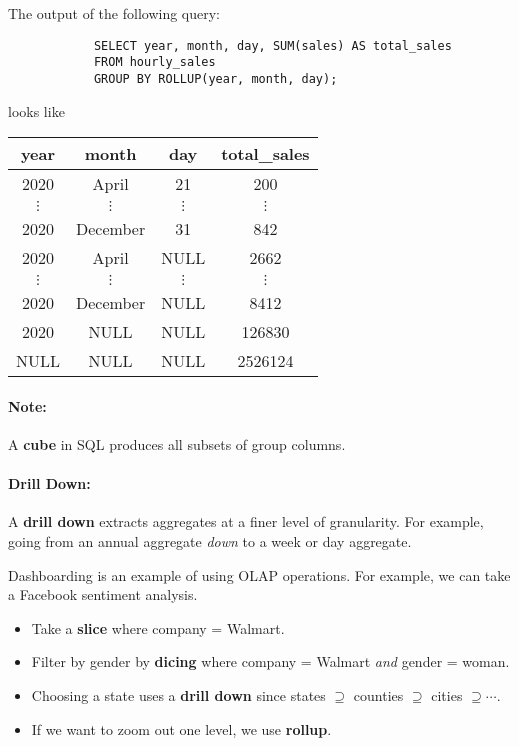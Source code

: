 \documentclass{report}
\newenvironment{example}{\begin{tcolorbox}[title={Example},colback=green!5!white,colframe=black!75!green]}{\end{tcolorbox}}
\renewcommand{\bf}[1]{\textbf{{#1}}}
\renewcommand{\it}[1]{\textit{{#1}}}
\begin{document}
\begin{example}
    The output of the following query:

    {
        \centering
        \begin{BVerbatim}
            SELECT year, month, day, SUM(sales) AS total_sales
            FROM hourly_sales
            GROUP BY ROLLUP(year, month, day);
        \end{BVerbatim}
        \par
    }

    looks like

    \centering
    \begin{tabular}{c|c|c|c}
        year & month & day & total\_sales \\
        \hline
        2020 & April & 21 & 200 \\
        $\vdots$ & $\vdots$ & $\vdots$ & $\vdots$ \\
        2020 & December & 31 & 842 \\
        2020 & April & NULL & 2662 \\
        $\vdots$ & $\vdots$ & $\vdots$ & $\vdots$ \\
        2020 & December & NULL & 8412 \\
        2020 & NULL & NULL & 126830 \\
        NULL & NULL & NULL & 2526124
    \end{tabular}
    \paragraph{Note:} A \bf{cube} in SQL produces all subsets of group columns.
\end{example}

\paragraph{Drill Down:} A \bf{drill down} extracts aggregates at a finer level
of granularity. For example, going from an annual aggregate \it{down} to a week
or day aggregate.

\begin{example}
    Dashboarding is an example of using OLAP operations. For example,
    we can take a Facebook sentiment analysis.
    \begin{itemize}[label=$\to$]
        \item Take a \bf{slice} where company = Walmart.
        \item Filter by gender by \bf{dicing} where company = Walmart \it{and}
            gender = woman.
        \item Choosing a state uses a \bf{drill down} since states $\supseteq$
            counties $\supseteq$ cities $\supseteq \cdots$.
        \item If we want to zoom out one level, we use \bf{rollup}.
    \end{itemize}
\end{example}
\end{document}
